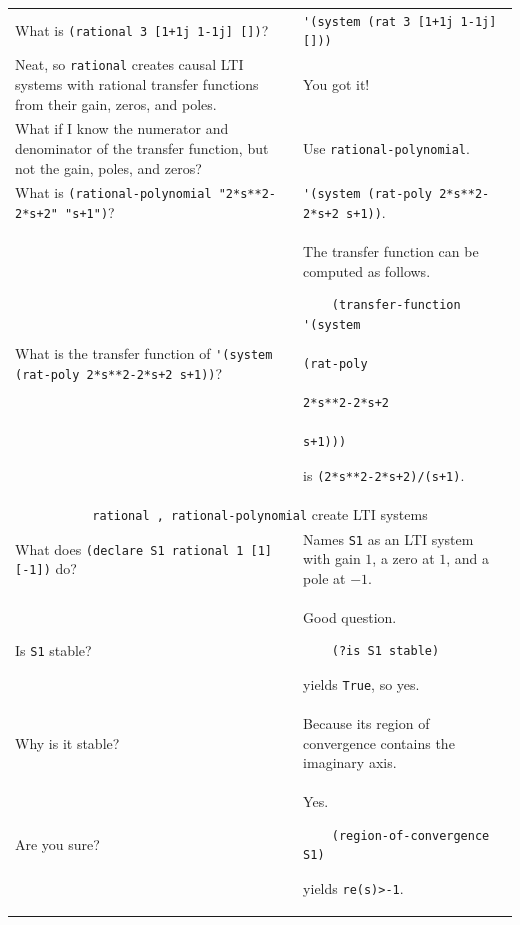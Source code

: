 \documentclass[11pt,letter]{article}
\begin{document}
\begin{longtable}{ p{} p{} }
  What is \lstinline!(rational 3 [1+1j 1-1j] [])!?
  &
  \lstinline!'(system (rat 3 [1+1j 1-1j] []))! \\

  Neat, so \lstinline!rational! creates causal LTI systems with rational transfer functions from their gain, zeros, and poles.
  &
  You got it! \\

  What if I know the numerator and denominator of the transfer function, but not the gain, poles, and zeros?
  &
  Use \lstinline!rational-polynomial!. \\

  What is \lstinline!(rational-polynomial "2*s**2-2*s+2" "s+1")!?
  &
  \lstinline!'(system (rat-poly 2*s**2-2*s+2 s+1))!. \\

  What is the transfer function of \lstinline!'(system (rat-poly 2*s**2-2*s+2 s+1))!?
  &
  The transfer function can be computed as follows.
  \begin{lstlisting}
    (transfer-function '(system
                          (rat-poly
                            2*s**2-2*s+2
                            s+1)))
  \end{lstlisting}
  is \lstinline!(2*s**2-2*s+2)/(s+1)!.\\

  \midrule

  \multicolumn{2}{c}{\Large\lstinline!rational , rational-polynomial! create LTI systems} \\

  \midrule

  What does \lstinline!(declare S1 rational 1 [1] [-1])! do?
  &
  Names \lstinline!S1! as an LTI system with gain $1$, a zero at $1$, and a pole at $-1$. \\

  Is \lstinline!S1! stable?
  &
  Good question.
  \begin{lstlisting}
    (?is S1 stable)
  \end{lstlisting}
  yields \lstinline!True!, so yes. \\

  Why is it stable?
  &
  Because its region of convergence contains the imaginary axis. \\

  Are you sure?
  &
  Yes.
  \begin{lstlisting}
    (region-of-convergence S1)
  \end{lstlisting}
  yields \lstinline!re(s)>-1!. \\


\end{longtable}
\end{document}
